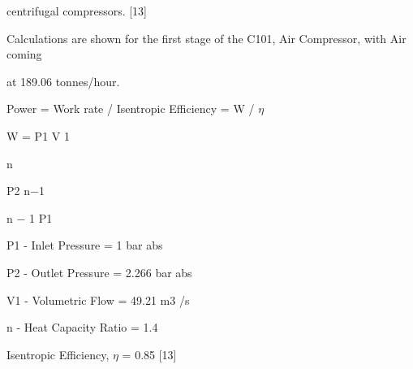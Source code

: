 \documentclass[a4paper,portrait,12pt]{article}
\begin{document}
\begin{flushleft}
centrifugal compressors. [13]
\end{flushleft}


\begin{flushleft}
Calculations are shown for the first stage of the C101, Air Compressor, with Air coming
\end{flushleft}


\begin{flushleft}
at 189.06 tonnes/hour.
\end{flushleft}


\begin{flushleft}
Power = Work rate / Isentropic Efficiency = W / $\eta$
\end{flushleft}


\begin{flushleft}
W = P1 V 1
\end{flushleft}





\begin{flushleft}
n
\end{flushleft}


\begin{flushleft}
P2 n$-$1
\end{flushleft}


\begin{flushleft}
[( ) n $-$ 1]
\end{flushleft}


\begin{flushleft}
n $-$ 1 P1
\end{flushleft}





\begin{flushleft}
P1 - Inlet Pressure = 1 bar abs
\end{flushleft}


\begin{flushleft}
P2 - Outlet Pressure = 2.266 bar abs
\end{flushleft}


\begin{flushleft}
V1 - Volumetric Flow = 49.21 m3 /s
\end{flushleft}


\begin{flushleft}
n - Heat Capacity Ratio = 1.4
\end{flushleft}


\begin{flushleft}
Isentropic Efficiency, $\eta$ = 0.85 [13]
\end{flushleft}
\end{document}
